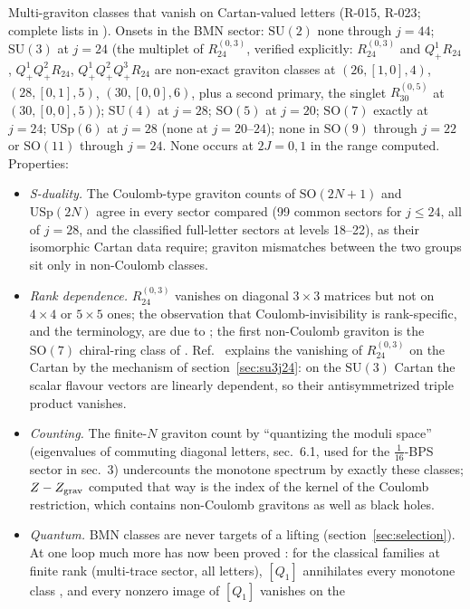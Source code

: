 \documentclass[11pt]{article}
\newcommand{\file}[1]{\path{#1}}
\newcommand{\R}[1]{\textsf{R-0#1}}
\newcommand{\SU}{\mathrm{SU}}
\newcommand{\SO}{\mathrm{SO}}
\newcommand{\USp}{\mathrm{USp}}
\begin{document}
Multi-graviton classes that vanish on Cartan-valued letters (\R{15}, \R{23}; complete lists in
\file{data/noncoulomb}). Onsets in the BMN sector: $\SU(2)$ none through $j=44$; $\SU(3)$ at $j=24$ (the multiplet of
$R_{24}^{(0,3)}$, verified explicitly: $R_{24}^{(0,3)}$ and $Q^1_+R_{24}$, $Q^1_+Q^2_+R_{24}$, $Q^1_+Q^2_+Q^3_+R_{24}$
are non-exact graviton classes at $(26,[1,0],4)$, $(28,[0,1],5)$, $(30,[0,0],6)$, plus a second primary, the singlet
$R_{30}^{(0,5)}$ at $(30,[0,0],5)$); $\SU(4)$ at $j=28$; $\SO(5)$ at $j=20$; $\SO(7)$ exactly at $j=24$; $\USp(6)$ at
$j=28$ (none at $j=20$--$24$); none in $\SO(9)$ through $j=22$ or $\SO(11)$ through $j=24$. None occurs at $2J=0,1$ in
the range computed. Properties:
\begin{itemize}
\item \emph{S-duality.} The Coulomb-type graviton counts of $\SO(2N+1)$ and $\USp(2N)$ agree in every sector compared
(99 common sectors for $j\le24$, all of $j=28$, and the classified full-letter sectors at levels 18--22), as their
isomorphic Cartan data require; graviton mismatches between the two groups sit only in non-Coulomb classes.
\item \emph{Rank dependence.} $R_{24}^{(0,3)}$ vanishes on diagonal $3\times3$ matrices but not on $4\times4$ or
$5\times5$ ones; the observation that Coulomb-invisibility is rank-specific, and the terminology, are due to
\cite{ChoiLee}; the first non-Coulomb graviton is the $\SO(7)$ chiral-ring class of \cite{CLSduality}. Ref.~\cite[sec.~7]{KVM}
explains the vanishing of $R_{24}^{(0,3)}$ on the Cartan by the mechanism of section~\ref{sec:su3j24}: on the $\SU(3)$
Cartan the scalar flavour vectors are linearly dependent, so their antisymmetrized triple product vanishes.
\item \emph{Counting.} The finite-$N$ graviton count by ``quantizing the moduli space'' (eigenvalues of commuting
diagonal letters, \cite{KMMR} sec.~6.1, used for the $\frac1{16}$-BPS sector in \cite{CCKLL} sec.~3) undercounts the
monotone spectrum by exactly these classes; $Z-Z_{\rm grav}$ computed that way is the index of the kernel of the
Coulomb restriction, which contains non-Coulomb gravitons as well as black holes.
\item \emph{Quantum.} BMN classes are never targets of a lifting (section~\ref{sec:selection}). At one loop much more
has now been proved \cite[sec.~6]{KVM}: for the classical families at finite rank (multi-trace sector, all letters),
$[Q_1]$ annihilates every monotone class \cite[eq.~(6.7)]{KVM}, and every nonzero image of $[Q_1]$ vanishes on the

\end{itemize}
\end{document}
